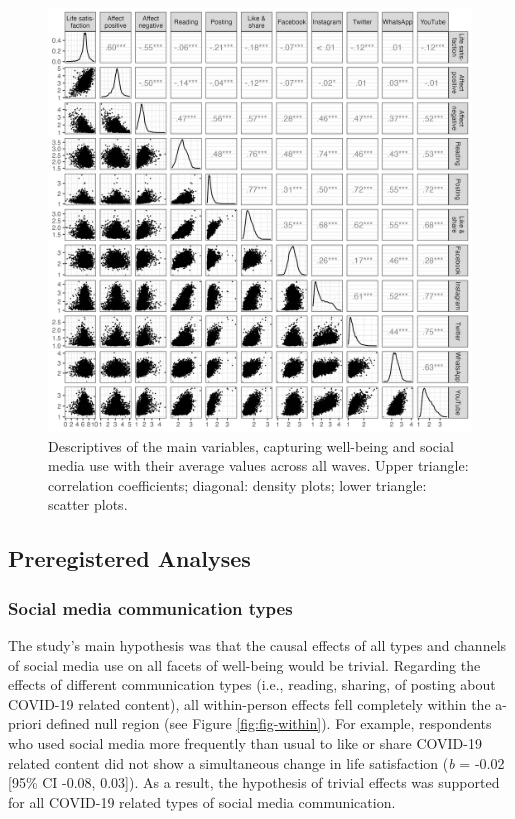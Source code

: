 \documentclass[
  man,mask,floatsintext]{apa7}
\begin{document}
\begin{figure}
\includegraphics[width=\textwidth]{figures/fig_cor} \caption{Descriptives of the main variables, capturing well-being and social media use with their average values across all waves. Upper triangle: correlation coefficients; diagonal: density plots; lower triangle: scatter plots.}\label{fig:fig-correlations}
\end{figure}

\hypertarget{preregistered-analyses}{%
\subsection{Preregistered Analyses}\label{preregistered-analyses}}

\hypertarget{social-media-communication-types}{%
\subsubsection{Social media communication types}\label{social-media-communication-types}}

The study's main hypothesis was that the causal effects of all types and channels of social media use on all facets of well-being would be trivial.
Regarding the effects of different communication types (i.e., reading, sharing, of posting about COVID-19 related content), all within-person effects fell completely within the a-priori defined null region (see Figure \ref{fig:fig-within}).
For example, respondents who used social media more frequently than usual to like or share COVID-19 related content did not show a simultaneous change in life satisfaction (\emph{b} = -0.02 {[}95\% CI -0.08, 0.03{]}).
As a result, the hypothesis of trivial effects was supported for all COVID-19 related types of social media communication.
\end{document}
